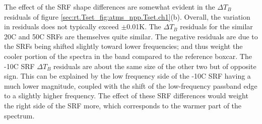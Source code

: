 The effect of the SRF shape differences are somewhat evident in the $\Delta T_B$ residuals of figure \ref{sec:rt.Tset_fig:atms_npp.Tset.ch1}(b). Overall, the variation in residuals does not typically exceed $\pm$0.01K. The $\Delta T_B$ residuals for the similar 20\textdegree{}C and 50\textdegree{}C SRFs are themselves quite similar. The negative residuals are due to the SRFs being shifted slightly toward lower frequencies; and thus weight the cooler portion of the spectra in the band compared to the reference boxcar. The -10\textdegree{}C SRF $\Delta T_B$ residuals are about the same size of the other two but of opposite sign. This can be explained by the low frequency side of the -10\textdegree{}C SRF having a much lower magnitude, coupled with the shift of the low-frequency passband edge to a slightly higher frequency. The effect of these SRF differences would weight the right side of the SRF more, which corresponds to the warmer part of the spectrum.
